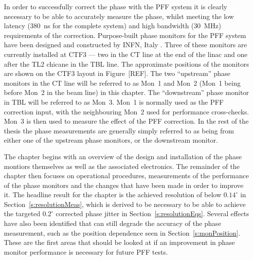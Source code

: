 
In order to successfully correct the phase with the PFF system it is clearly necessary to be able to accurately measure the phase, whilst meeting the low latency (380~ns for the complete system) and high bandwidth (30~MHz) requirements of the correction. Purpose-built phase monitors for the PFF system have been designed and constructed by INFN, Italy \cite{phMonEuCard}. Three of these monitors are currently installed at CTF3 --- two in the CT line at the end of the linac and one after the TL2 chicane in the TBL line. The approximate positions of the monitors are shown on the CTF3 layout in Figure~[REF]. The two ``upstream'' phase monitors in the CT line will be referred to as Mon~1 and Mon~2 (Mon~1 being before Mon~2 in the beam line) in this chapter. The ``downstream'' phase monitor in TBL will be referred to as Mon~3. Mon~1 is normally used as the PFF correction input, with the neighbouring Mon~2 used for performance cross-checks. Mon~3 is then used to measure the effect of the PFF correction. In the rest of the thesis the phase measurements are generally simply referred to as being from either one of the upstream phase monitors, or the downstream monitor. 

The chapter begins with an overview of the design and installation of the phase montiors themselves as well as the associated electronics. The remainder of the chapter then focuses on operational procedures, measurements of the performance of the phase monitors and the changes that have been made in order to improve it. The headline result for the chapter is the achieved resolution of below \(0.14^\circ\) in Section~\ref{s:resolutionMeas}, which is derived to be necessary to be able to achieve the targeted \(0.2^\circ\) corrected phase jitter in Section~\ref{s:resolutionEqs}. Several effects have also been identified that can still degrade the accuracy of the phase measurement, such as the position dependence seen in Section~\ref{s:monPosition}. These are the first areas that should be looked at if an improvement in phase monitor performance is necessary for future PFF tests.


